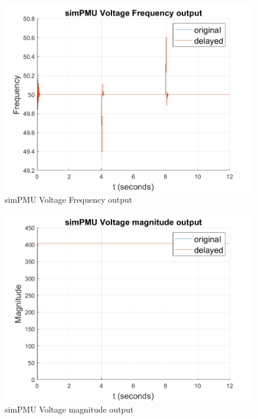 \begin{figure}[ht]
    \includegraphics[width=\textwidth]{figures/v_FreqFig.png}    
    \caption{simPMU Voltage Frequency output}
    \label{fig:simPMU-freqfig}
\end{figure}

\begin{figure}[ht]
    \includegraphics[width=\textwidth]{figures/v_MagFig.png}    
    \caption{simPMU Voltage magnitude output}
    \label{fig:simPMU-magfig}
\end{figure}










